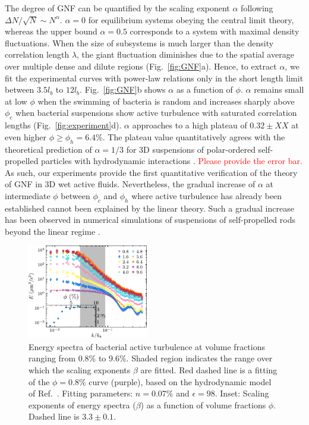\documentclass[twocolumn,aps,prl,amsmath,amssymb,longbibliography]{revtex4-2}
\begin{document}
The degree of GNF can be quantified by the scaling exponent $\alpha$ following $\Delta N/\sqrt{N} \sim N^\alpha$. $\alpha=0$ for equilibrium systems obeying the central limit theory, whereas the upper bound $\alpha = 0.5$ corresponds to a system with maximal density fluctuations. When the size of subsystems is much larger than the density correlation length $\lambda$, the giant fluctuation diminishes due to the spatial average over multiple dense and dilute regions (Fig.~\ref{fig:GNF}a). Hence, to extract $\alpha$, we fit the experimental curves with power-law relations only in the short length limit between $3.5l_b$ to $12 l_b$. Fig.~\ref{fig:GNF}b shows $\alpha$ as a function of $\phi$. $\alpha$ remains small at low $\phi$ when the swimming of bacteria is random and increases sharply above $\phi_c$ when bacterial suspensions show active turbulence with saturated correlation lengths (Fig.~\ref{fig:experiment}d).
$\alpha$ approaches to a high plateau of $0.32 \pm XX$ at even higher $\phi \geq \phi_h = 6.4\%$. The plateau value quantitatively agrees with the theoretical prediction of $\alpha = 1/3$ for 3D suspensions of polar-ordered self-propelled particles with hydrodynamic interactions \cite{AditiSimha2002}. \textcolor{red}{Please provide the error bar.} As such, our experiments provide the first quantitative verification of the theory of GNF in 3D wet active fluids. Nevertheless, the gradual increase of $\alpha$ at intermediate $\phi$ between $\phi_c$ and $\phi_h$ where active turbulence has already been established cannot been explained by the linear theory. Such a gradual increase has been observed in numerical simulations of suspensions of self-propelled rods beyond the linear regime \cite{Saintillan2012}.

\begin{figure}[!]
\begin{center}\includegraphics[width=0.47\textwidth]{Figures/energy-spectra/v3.pdf}
\caption[Concentration dependence of energy spectra.]
{
Energy spectra of bacterial active turbulence at volume fractions ranging from 0.8\% to 9.6\%. Shaded region indicates the range over which the scaling exponents $\beta$ are fitted. Red dashed line is a fitting of the $\phi=0.8\%$ curve (purple), based on the hydrodynamic model of Ref.~\cite{Bardfalvy2019}. Fitting parameters: $n=0.07\%$ and $\epsilon=98$.
Inset: Scaling exponents of energy spectra ($\beta$) as a function of volume fractions $\phi$. Dashed line is $3.3 \pm 0.1$.
}
\label{fig:energy-spectra}
\end{center}
\end{figure}
\end{document}
